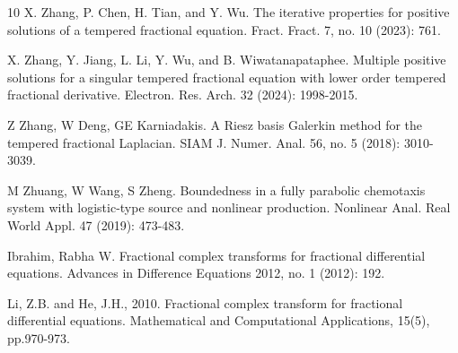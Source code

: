 \documentclass{article}
\begin{document}
\begin{thebibliography}{10}
X. Zhang, P. Chen, H. Tian, and Y. Wu. The iterative properties for positive solutions of a tempered fractional equation. Fract. Fract. 7, no. 10 (2023): 761.

X. Zhang, Y. Jiang, L. Li, Y. Wu, and B. Wiwatanapataphee. Multiple positive solutions for a singular tempered fractional equation with lower order tempered fractional derivative. Electron. Res. Arch. 32 (2024): 1998-2015.

Z Zhang, W Deng, GE Karniadakis. A Riesz basis Galerkin method for the tempered fractional Laplacian. SIAM J. Numer. Anal. 56, no. 5 (2018): 3010-3039.

M Zhuang, W Wang, S Zheng. Boundedness in a fully parabolic chemotaxis system with logistic-type source and nonlinear production. Nonlinear Anal. Real World Appl. 47 (2019): 473-483.

Ibrahim, Rabha W. Fractional complex transforms for fractional differential equations. Advances in Difference Equations 2012, no. 1 (2012): 192.


Li, Z.B. and He, J.H., 2010. Fractional complex transform for fractional differential equations. Mathematical and Computational Applications, 15(5), pp.970-973.


%
%






\end{thebibliography}
\end{document}
